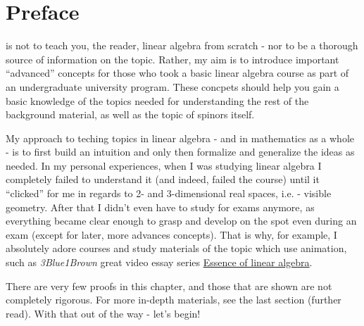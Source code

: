 \section{Preface}
 is not to teach you, the reader, linear algebra from scratch - nor to be a thorough source of information on the topic. Rather, my aim is to introduce important \enquote{advanced} concepts for those who took a basic linear algebra course as part of an undergraduate university program. These concpets should help you gain a basic knowledge of the topics needed for understanding the rest of the background material, as well as the topic of spinors itself.

My approach to teching topics in linear algebra - and in mathematics as a whole - is to first build an intuition and only then formalize and generalize the ideas as needed. In my personal experiences, when I was studying linear algebra I completely failed to understand it (and indeed, failed the course) until it \enquote{clicked} for me in regards to 2- and 3-dimensional real spaces, i.e. - visible geometry. After that I didn't even have to study for exams anymore, as everything became clear enough to grasp and develop on the spot even during an exam (except for later, more advances concepts). That is why, for example, I absolutely adore courses and study materials of the topic which use animation, such as \textit{3Blue1Brown} great video essay series \href{https://www.3blue1brown.com/topics/linear-algebra}{Essence of linear algebra}.

There are very few proofs in this chapter, and those that are shown are not completely rigorous. For more in-depth materials, see the last section (further read). With that out of the way - let's begin!
\newpage
